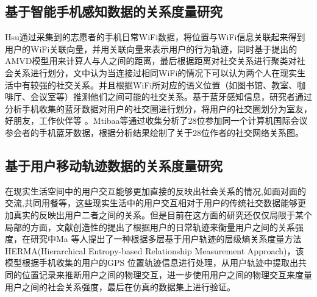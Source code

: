 \subsection{基于智能手机感知数据的关系度量研究}
Hsu通过采集到的志愿者的手机日常WiFi数据，将位置与WiFi信息关联起来得到用户的WiFi关联向量，并用关联向量来表示用户的行为轨迹，同时基于提出的AMVD模型用来计算人与人之间的距离，最后根据距离对社交关系进行聚类对社会关系进行划分，文中认为当连接过相同WiFi的情况下可以认为两个人在现实生活中有较强的社交关系。并且根据WiFi所对应的语义位置（如图书馆、教室、咖啡厅、会议室等）推测他们之间可能的社交关系。基于蓝牙感知信息，研究者通过分析手机收集的蓝牙数据对用户的社交圈进行划分，将用户的社交圈划分为室友，好朋友，工作伙伴等
。Mtibaa等通过收集分析了28位参加同一个计算机国际会议参会者的手机蓝牙数据，根据分析结果绘制了关于28位作者的社交网络关系图。
\subsection{基于用户移动轨迹数据的关系度量研究}
在现实生活空间中的用户交互能够更加直接的反映出社会关系的情况,如面对面的交流,共同用餐等，这些现实生活中的用户交互相对于用户的传统社交数据能够更加真实的反映出用户二者之间的关系。但是目前在这方面的研究还仅仅局限于某个局部的方面，文献\cite{ma2014effective}创造性的提出了根据用户的日常轨迹来衡量用户之间的关系强度，在研究中Ma 等人提出了一种根据多层基于用户轨迹的层级熵关系度量方法HERMA(Hierarchical Entropy-based Relationship Measurement Approach)，该模型根据手机收集的用户的GPS 位置轨迹信息进行处理，从用户轨迹中提取出共同的位置记录来推断用户之间的物理交互，进一步使用用户之间的物理交互来度量用户之间的社会关系强度，最后在仿真的数据集上进行验证。



